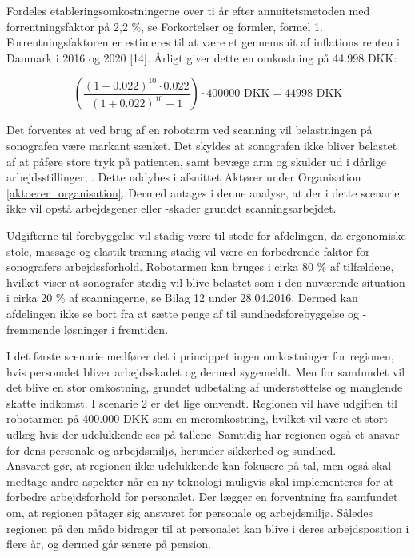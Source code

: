 Fordeles etableringsomkostningerne over ti år efter annuitetsmetoden med forrentningsfaktor på 2,2 \%, se Forkortelser og formler, formel 1. Forrentningsfaktoren er estimeres til at være et gennemsnit af inflations renten i Danmark i 2016 og 2020 [14]. Årligt giver dette en omkostning på 44.998 DKK:

\begin{equation}
\left(\frac{(1+0.022)^{10}\cdot0.022}{(1+0.022)^{10}-1}\right)\cdot400000 \text{ DKK}=44998 \text{ DKK}
\end{equation}

Det forventes at ved brug af en robotarm ved scanning vil belastningen på sonografen være markant sænket. Det skyldes at sonografen ikke bliver belastet af at påføre store tryk på patienten, samt bevæge arm og skulder ud i dårlige arbejdsstillinger, \cite{31}. Dette uddybes i afsnittet Aktører under Organisation \ref{aktoerer_organisation}. Dermed antages i denne analyse, at der i dette scenarie ikke vil opstå arbejdsgener eller -skader grundet scanningsarbejdet. 

Udgifterne til forebyggelse vil stadig være til stede for afdelingen, da ergonomiske stole, massage og elastik-træning stadig vil være en forbedrende faktor for sonografers arbejdssforhold. Robotarmen kan bruges i cirka 80 \% af tilfældene, hvilket viser at sonografer stadig vil blive belastet som i den nuværende situation i cirka 20 \% af scanningerne, se Bilag 12 under 28.04.2016. Dermed kan afdelingen ikke se bort fra at sætte penge af til sundhedsforebyggelse og - fremmende løsninger i fremtiden.  

I det første scenarie medfører det i princippet ingen omkostninger for regionen, hvis personalet bliver arbejdsskadet og dermed sygemeldt. Men for samfundet vil det blive en stor omkostning, grundet udbetaling af understøttelse og manglende skatte indkomst. I scenarie 2 er det lige omvendt. Regionen vil have udgiften til robotarmen på 400.000 DKK som en meromkostning, hvilket vil være et stort udlæg hvis der udelukkende ses på tallene. Samtidig har regionen også et ansvar for dens personale og arbejdsmiljø, herunder sikkerhed og sundhed. \\
Ansvaret gør, at regionen ikke udelukkende kan fokusere på tal, men også skal medtage andre aspekter når en ny teknologi muligvis skal implementeres for at forbedre arbejdsforhold for personalet. Der lægger en forventning fra samfundet om, at regionen påtager sig ansvaret for personale og arbejdsmiljø. Således regionen på den måde bidrager til at personalet kan blive i deres arbejdsposition i flere år, og dermed går senere på pension. 

